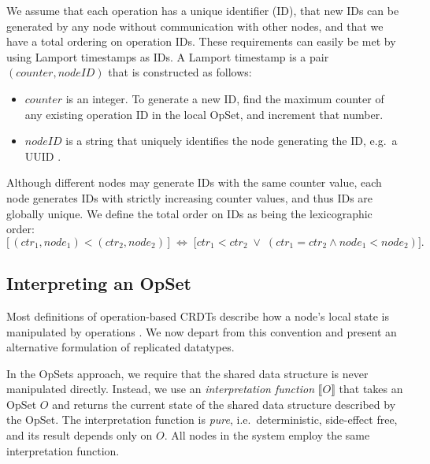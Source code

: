 We assume that each operation has a unique identifier (ID), that new IDs can be generated by any node without communication with other nodes, and that we have a total ordering on operation IDs.
These requirements can easily be met by using Lamport timestamps \cite{Lamport:1978jq} as IDs.
A Lamport timestamp is a pair $(\mathit{counter}, \mathit{nodeID})$ that is constructed as follows:
\begin{itemize}
\item $\mathit{counter}$ is an integer.
    To generate a new ID, find the maximum counter of any existing operation ID in the local OpSet, and increment that number.
\item $\mathit{nodeID}$ is a string that uniquely identifies the node generating the ID, e.g.\ a UUID \cite{Leach:2005hm}.
\end{itemize}

Although different nodes may generate IDs with the same counter value, each node generates IDs with strictly increasing counter values, and thus IDs are globally unique.
We define the total order on IDs as being the lexicographic order:
\[
    \big[ \,(\mathit{ctr}_1, \mathit{node}_1) < (\mathit{ctr}_2, \mathit{node}_2)\, \big]
    \;\Longleftrightarrow\;
    \big[ \mathit{ctr}_1 < \mathit{ctr}_2 \;\vee\;
    (\mathit{ctr}_1 = \mathit{ctr}_2 \wedge \mathit{node}_1 <\mathit{node}_2) \big].
\]


\subsection{Interpreting an OpSet}\label{sec:op-serial}

Most definitions of operation-based CRDTs describe how a node's local state is manipulated by operations \cite{Shapiro:2011wy,Shapiro:2011un}.
We now depart from this convention and present an alternative formulation of replicated datatypes.

In the OpSets approach, we require that the shared data structure is never manipulated directly.
Instead, we use an \emph{interpretation function} $\llbracket O \rrbracket$ that takes an OpSet $O$ and returns the current state of the shared data structure described by the OpSet.
The interpretation function is \emph{pure}, i.e.\ deterministic, side-effect free, and its result depends only on $O$.
All nodes in the system employ the same interpretation function.

